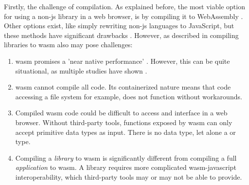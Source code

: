 
Firstly, the challenge of compilation. 
As explained before, the most viable option for using a non-js library in a web browser, is by compiling it to WebAssembly \citep{haas_bringing_2017}.
Other options exist, like simply rewriting non-js languages to JavaScript, but these methods have significant drawbacks \citep{haas_bringing_2017,jangda_not_2019}.
However, as described in  compiling libraries to \ac{wasm} also may pose challenges:


\begin{enumerate}[-]
  \item \ac{wasm} promises a 'near native performance' \citep{haas_bringing_2017}. However, this can be quite situational, as multiple studies have shown \citep{jangda_not_2019, melch_performance_2019}. 
  \item \ac{wasm} cannot compile all code. Its containerized nature means that code accessing a file system for example, does not function without workarounds. 
  \item Compiled \ac{wasm} code could be difficult to access and interface in a web browser. Without third-party tools, functions exposed by \ac{wasm} can only accept primitive data types as input. There is no  data type, let alone a  or  type. 
  \item Compiling a \emph{library} to \ac{wasm} is significantly different from compiling a full \emph{application} to \ac{wasm}. A library requires more complicated wasm-javascript interoperability, which third-party tools may or may not be able to provide.
\end{enumerate}

